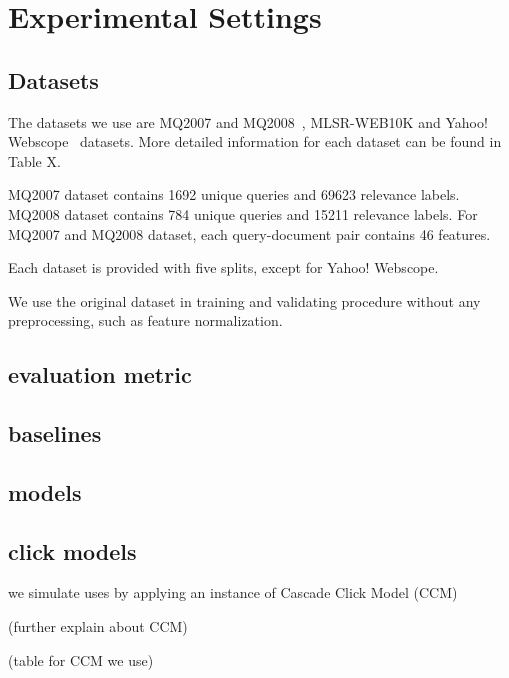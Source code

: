 \section{Experimental Settings}



\subsection{Datasets}
The datasets we use are MQ2007 and MQ2008~\cite{DBLP:journals/corr/QinL13}, MLSR-WEB10K\cite{DBLP:journals/corr/QinL13} and Yahoo! Webscope~\cite{DBLP:journals/jmlr/ChapelleC11} datasets. More detailed information for each dataset can be found in Table X.

MQ2007 dataset contains 1692 unique queries and 69623 relevance labels. MQ2008 dataset contains 784 unique queries and 15211 relevance labels. For MQ2007 and MQ2008 dataset, each query-document pair contains 46 features.

Each dataset is provided with five splits, except for Yahoo! Webscope.

We use the original dataset in training and validating procedure without any preprocessing, such as feature normalization.

\subsection{evaluation metric}

\subsection{baselines}


\subsection{models}

\subsection{click models}
we simulate uses by applying an instance of Cascade Click Model (CCM)~\cite{}

(further explain about CCM)

(table for CCM we use)


